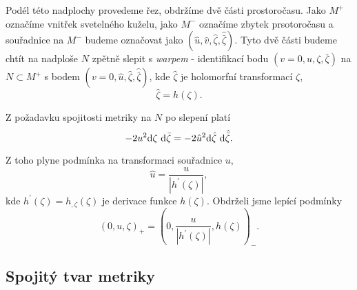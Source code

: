 Podél této nadplochy provedeme řez, obdržíme dvě části prostoročasu. Jako $M^+$ označíme vnitřek
svetelného kuželu, jako $M^-$ označíme zbytek prsotoročasu a souřadnice na $M^-$ budeme označovat jako $(\hat{u}, \hat{v}, \hat{\zeta}, \hat{\bar{\zeta}})$.
Tyto dvě části budeme chtít na nadploše $N$ zpětně slepit s \emph{warpem} - identifikací bodu $(v=0, u, \zeta, \bar{\zeta})$ na $N \subset M^+$
s bodem $(v = 0, \hat{u}, \hat{\zeta}, \hat{\bar{\zeta}})$, kde $\hat{\zeta}$ je holomorfní transformací $\zeta$,
\begin{equation}
    \label{eq:zeta_holomorfni_h}
    \hat{\zeta} = h(\zeta).
\end{equation}

Z požadavku spojitosti metriky na $N$ po slepení platí
\begin{equation}
    -2 u^2 \mathrm{d} \zeta ~ \mathrm{d} \bar{\zeta} = -2 \hat{u}^2 \mathrm{d} \hat{\zeta} ~ \mathrm{d} \hat{\bar{\zeta}}.
\end{equation}

Z toho plyne podmínka na transformaci souřadnice $u$,
\begin{equation}
    \label{eq:u_podminka_spojitosti}
    \hat{u} = \frac{u}{\left| h^{'}(\zeta) \right|},
\end{equation}
kde $h^{'}(\zeta) = h_{,\zeta}(\zeta)$ je derivace funkce $h(\zeta)$.
Obdrželi jsme lepící podmínky
\begin{equation}
    \label{eq:exp_penrose_lepici_podminky}
    (0, u, \zeta)_+ = \left(0, \frac{u}{\left| h^{'}(\zeta)\right|}, h(\zeta)\right)_{-}.
\end{equation}

\subsection{Spojitý tvar metriky}

